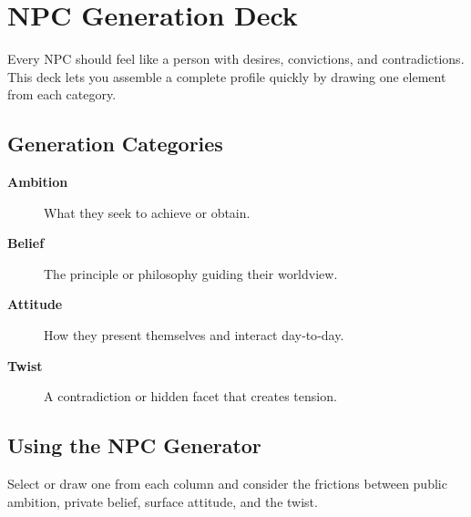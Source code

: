 \section{NPC Generation Deck}\label{sec:npc_generation}

Every NPC should feel like a person with desires, convictions, and contradictions. This deck lets you assemble a complete profile quickly by drawing one element from each category.

\subsection{Generation Categories}\label{subsec:npc_categories}

\begin{description}
    \item[\textbf{Ambition}] What they seek to achieve or obtain. 
    \item[\textbf{Belief}] The principle or philosophy guiding their worldview. 
    \item[\textbf{Attitude}] How they present themselves and interact day‑to‑day. 
    \item[\textbf{Twist}] A contradiction or hidden facet that creates tension. 
\end{description}

\subsection{Using the NPC Generator}\label{subsec:npc_usage}
Select or draw one from each column and consider the frictions between public ambition, private belief, surface attitude, and the twist.

